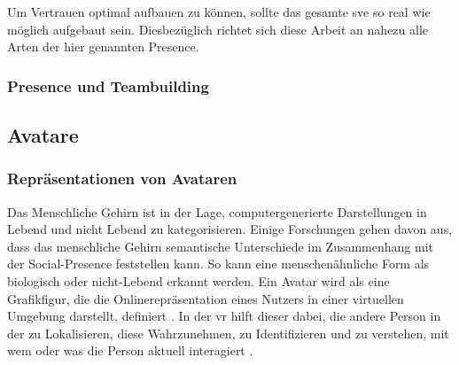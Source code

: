 \documentclass[a4paper,11pt]{article}%
\renewcommand{\\}{\vspace*{0.5\baselineskip} \newline}
\begin{document}
Um Vertrauen optimal aufbauen zu können, sollte das gesamte \ac{sve} so real wie möglich aufgebaut sein. Diesbezüglich richtet sich diese Arbeit an nahezu alle Arten der hier genannten \dq{}Presence\dq{}.

\subsubsection{Presence und Teambuilding}

\newpage

\subsection{Avatare}
\label{Avatare}
\subsubsection{Repräsentationen von Avataren}

Das Menschliche Gehirn ist in der Lage, computergenerierte Darstellungen in \dq{}Lebend und nicht Lebend\dq{} zu kategorisieren. Einige Forschungen gehen davon aus, dass das menschliche Gehirn semantische Unterschiede im Zusammenhang mit der \dq{}Social-Presence\dq{} feststellen kann. So kann eine menschenähnliche Form als biologisch oder nicht-Lebend erkannt werden. 
Ein Avatar wird als eine Grafikfigur, die die Onlinerepräsentation eines Nutzers in einer virtuellen Umgebung darstellt, definiert \citep[p.1]{neustaedter2009presenting}. In der \ac{vr} hilft dieser dabei, die andere Person in der zu Lokalisieren, diese Wahrzunehmen, zu Identifizieren und zu verstehen, mit wem oder was die Person aktuell interagiert \citep[]{pan2017impact}.
\end{document}
